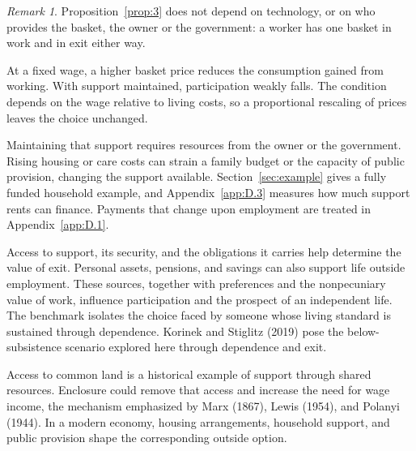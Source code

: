 \documentclass[12pt]{article}
\theoremstyle{plain}
\theoremstyle{definition}
\theoremstyle{remark}
\newtheorem*{remark}{Remark}
\begin{document}
\begin{remark}
Proposition~\ref{prop:3} does not depend on technology, or on who provides the basket, the owner or the government: a worker has one basket in work and in exit either way.
\end{remark}

At a fixed wage, a higher basket price reduces the consumption gained from working. With support maintained, participation weakly falls. The condition depends on the wage relative to living costs, so a proportional rescaling of prices leaves the choice unchanged.

Maintaining that support requires resources from the owner or the government. Rising housing or care costs can strain a family budget or the capacity of public provision, changing the support available. Section~\ref{sec:example} gives a fully funded household example, and Appendix~\ref{app:D.3} measures how much support rents can finance. Payments that change upon employment are treated in Appendix~\ref{app:D.1}.

Access to support, its security, and the obligations it carries help determine the value of exit.
Personal assets, pensions, and savings can also support life outside employment. These sources, together with preferences and the nonpecuniary value of work, influence participation and the prospect of an independent life. The benchmark isolates the choice faced by someone whose living standard is sustained through dependence.
Korinek and Stiglitz (2019) pose the below-subsistence scenario explored here through dependence and exit.

Access to common land is a historical example of support through shared resources. Enclosure could remove that access and increase the need for wage income, the mechanism emphasized by Marx (1867), Lewis (1954), and Polanyi (1944). In a modern economy, housing arrangements, household support, and public provision shape the corresponding outside option.
\end{document}
